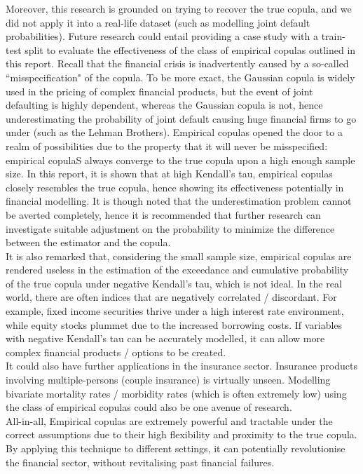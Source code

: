 \documentclass[12pt]{report}
\newcommand{\1}{\mathbf{1}}
\begin{document}
\begin{flushleft}
\vspace{0.5cm}
Moreover, this research is grounded on trying to recover the true copula, and we did not apply it into a real-life dataset (such as modelling joint default probabilities). Future research could entail providing a case study with a train-test split to evaluate the effectiveness of the class of empirical copulas outlined in this report. Recall that the financial crisis is inadvertently caused by a so-called ``misspecification" of the copula. To be more exact, the Gaussian copula is widely used in the pricing of complex financial products, but the event of joint defaulting is highly dependent, whereas the Gaussian copula is not, hence underestimating the probability of joint default causing huge financial firms to go under (such as the Lehman Brothers). Empirical copulas opened the door to a realm of possibilities due to the property that it will never be misspecified: empirical copulaS always converge to the true copula upon a high enough sample size. In this report, it is shown that at high Kendall's tau, empirical copulas closely resembles the true copula, hence showing its effectiveness potentially in financial modelling. It is though noted that the underestimation problem cannot be averted completely, hence it is recommended that further research can investigate suitable adjustment on the probability to minimize the difference between the estimator and the copula.\\
\vspace{0.5cm}
It is also remarked that, considering the small sample size, empirical copulas are rendered useless in the estimation of the exceedance and cumulative probability of the true copula under negative Kendall's tau, which is not ideal. In the real world, there are often indices that are negatively correlated / discordant. For example, fixed income securities thrive under a high interest rate environment, while equity stocks plummet due to the increased borrowing costs. If variables with negative Kendall's tau can be accurately modelled, it can allow more complex financial products / options to be created.\\
\vspace{0.5cm}
It could also have further applications in the insurance sector. Insurance products involving multiple-persons (couple insurance) is virtually unseen. Modelling bivariate mortality rates / morbidity rates (which is often extremely low) using the class of empirical copulas could also be one avenue of research.\\
\vspace{0.5cm}
All-in-all, Empirical copulas are extremely powerful and tractable under the correct assumptions due to their high flexibility and proximity to the true copula. By applying this technique to different settings, it can potentially revolutionise the financial sector, without revitalising past financial failures.



\end{flushleft}
 
\medskip

\printbibliography
\end{document}
